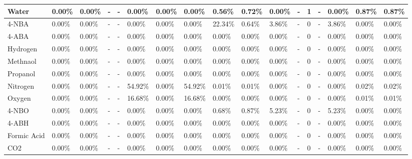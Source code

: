 \begin{landscape}
\begin{table}[H]
\begin{tabular}{|l|l|l|l|l|l|l|l|l|l|l|l|l|l|l|l|l|}
Water                   & 0.00\%   & 0.00\%   & -    & -    & 0.00\%  & 0.00\%   & 0.00\%  & 0.56\%  & 0.72\%  & 0.00\%  & -    & 1    & -    & 0.00\%  & 0.87\%  & 0.87\%  \\ \hline
4-NBA                   & 0.00\%   & 0.00\%   & -    & -    & 0.00\%  & 0.00\%   & 0.00\%  & 22.34\% & 0.64\%  & 3.86\%  & -    & 0    & -    & 3.86\%  & 0.00\%  & 0.00\%  \\ \hline
4-ABA                   & 0.00\%   & 0.00\%   & -    & -    & 0.00\%  & 0.00\%   & 0.00\%  & 0.00\%  & 0.00\%  & 0.00\%  & -    & 0    & -    & 0.00\%  & 0.00\%  & 0.00\%  \\ \hline
Hydrogen                & 0.00\%   & 0.00\%   & -    & -    & 0.00\%  & 0.00\%   & 0.00\%  & 0.00\%  & 0.00\%  & 0.00\%  & -    & 0    & -    & 0.00\%  & 0.00\%  & 0.00\%  \\ \hline
Methnaol                & 0.00\%   & 0.00\%   & -    & -    & 0.00\%  & 0.00\%   & 0.00\%  & 0.00\%  & 0.00\%  & 0.00\%  & -    & 0    & -    & 0.00\%  & 0.00\%  & 0.00\%  \\ \hline
Propanol                & 0.00\%   & 0.00\%   & -    & -    & 0.00\%  & 0.00\%   & 0.00\%  & 0.00\%  & 0.00\%  & 0.00\%  & -    & 0    & -    & 0.00\%  & 0.00\%  & 0.00\%  \\ \hline
Nitrogen                & 0.00\%   & 0.00\%   & -    & -    & 54.92\% & 0.00\%   & 54.92\% & 0.01\%  & 0.01\%  & 0.00\%  & -    & 0    & -    & 0.00\%  & 0.02\%  & 0.02\%  \\ \hline
Oxygen                  & 0.00\%   & 0.00\%   & -    & -    & 16.68\% & 0.00\%   & 16.68\% & 0.00\%  & 0.00\%  & 0.00\%  & -    & 0    & -    & 0.00\%  & 0.01\%  & 0.01\%  \\ \hline
4-NBO                   & 0.00\%   & 0.00\%   & -    & -    & 0.00\%  & 0.00\%   & 0.00\%  & 0.68\%  & 0.87\%  & 5.23\%  & -    & 0    & -    & 5.23\%  & 0.00\%  & 0.00\%  \\ \hline
4-ABH                   & 0.00\%   & 0.00\%   & -    & -    & 0.00\%  & 0.00\%   & 0.00\%  & 0.00\%  & 0.00\%  & 0.00\%  & -    & 0    & -    & 0.00\%  & 0.00\%  & 0.00\%  \\ \hline
Formic Acid             & 0.00\%   & 0.00\%   & -    & -    & 0.00\%  & 0.00\%   & 0.00\%  & 0.00\%  & 0.00\%  & 0.00\%  & -    & 0    & -    & 0.00\%  & 0.00\%  & 0.00\%  \\ \hline
CO2                     & 0.00\%   & 0.00\%   & -    & -    & 0.00\%  & 0.00\%   & 0.00\%  & 0.00\%  & 0.00\%  & 0.00\%  & -    & 0    & -    & 0.00\%  & 0.00\%  & 0.00\%  \\ \hline
\end{tabular}
\end{table}


\end{landscape}
